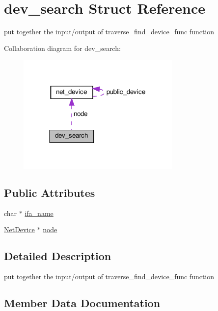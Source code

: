 \hypertarget{structdev__search}{}\section{dev\+\_\+search Struct Reference}
\label{structdev__search}


put together the input/output of traverse\+\_\+find\+\_\+device\+\_\+func function  




Collaboration diagram for dev\+\_\+search\+:
\nopagebreak
\begin{figure}[H]
\begin{center}
\leavevmode
\includegraphics[width=227pt]{structdev__search__coll__graph}
\end{center}
\end{figure}
\subsection*{Public Attributes}
\begin{DoxyCompactItemize}
\item 
char $\ast$ \hyperlink{structdev__search_aadbdb4aa908f31261dfdc059cd223771}{ifa\+\_\+name}
\item 
\hyperlink{gnode-object_8h_ab9c23d3a2ba4d9157b5ab053f61388dc}{Net\+Device} $\ast$ \hyperlink{structdev__search_a758a734f7e35a194280148f6737a829d}{node}
\end{DoxyCompactItemize}


\subsection{Detailed Description}
put together the input/output of traverse\+\_\+find\+\_\+device\+\_\+func function 

\subsection{Member Data Documentation}
\mbox{\label{structdev__search_aadbdb4aa908f31261dfdc059cd223771}} 

